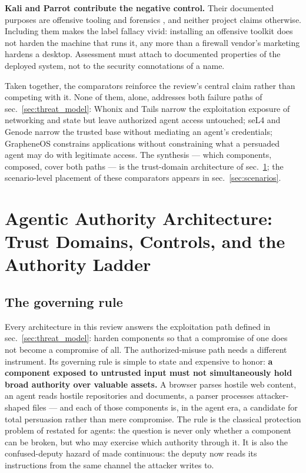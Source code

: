\documentclass[
  english,
  9pt,
]{extarticle}
\begin{document}
\textbf{Kali and Parrot contribute the negative control.} Their
documented purposes are offensive tooling and forensics
\citep{kali_intended_use, parrot_intended_use}, and neither project
claims otherwise. Including them makes the label fallacy vivid:
installing an offensive toolkit does not harden the machine that runs
it, any more than a firewall vendor's marketing hardens a desktop.
Assessment must attach to documented properties of the deployed system,
not to the security connotations of a name.

Taken together, the comparators reinforce the review's central claim
rather than competing with it. None of them, alone, addresses both
failure paths of sec.~\ref{sec:threat_model}: Whonix and Tails narrow
the exploitation exposure of networking and state but leave authorized
agent access untouched; seL4 and Genode narrow the trusted base without
mediating an agent's credentials; GrapheneOS constrains applications
without constraining what a persuaded agent may do with legitimate
access. The synthesis --- which components, composed, cover both paths
--- is the trust-domain architecture of
sec.~\ref{sec:agentic_authority}; the scenario-level placement of these
comparators appears in sec.~\ref{sec:scenarios}.

\newpage

\section{Agentic Authority Architecture: Trust Domains, Controls, and
the Authority Ladder}\label{sec:agentic_authority}

\subsection{The governing rule}\label{the-governing-rule}

Every architecture in this review answers the exploitation path defined
in sec.~\ref{sec:threat_model}: harden components so that a compromise
of one does not become a compromise of all. The authorized-misuse path
needs a different instrument. Its governing rule is simple to state and
expensive to honor: \textbf{a component exposed to untrusted input must
not simultaneously hold broad authority over valuable assets.} A browser
parses hostile web content, an agent reads hostile repositories and
documents, a parser processes attacker-shaped files --- and each of
those components is, in the agent era, a candidate for total persuasion
rather than mere compromise. The rule is the classical protection
problem of \citep{lampson1974} restated for agents: the question is
never only whether a component can be broken, but who may exercise which
authority through it. It is also the confused-deputy hazard of
\citep{hardy1988} made continuous: the deputy now reads its instructions
from the same channel the attacker writes to.
\end{document}
